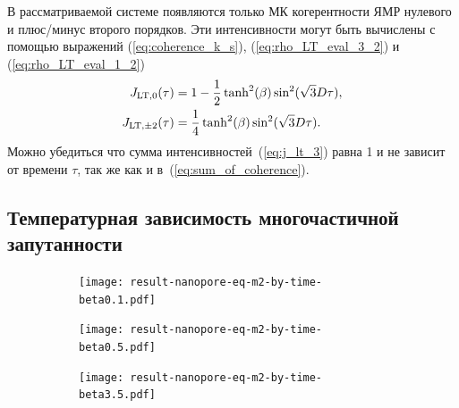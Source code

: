 В рассматриваемой системе появляются только МК когерентности ЯМР нулевого и плюс/минус второго порядков.
Эти интенсивности могут быть вычислены с помощью выражений
(\ref{eq:coherence_k_s}), (\ref{eq:rho_LT_eval_3_2}) и (\ref{eq:rho_LT_eval_1_2})
%
\begin{align}\label{eq:j_lt_3}
  J_{\mathrm{LT}, 0}(\tau) & = 1 - \frac 1 2 \tanh^2(\beta)\sin^2(\sqrt 3 D \tau), \notag \\
  J_{\mathrm{LT},\pm 2}(\tau) & = \frac 1 4 \tanh^2(\beta)\sin^2(\sqrt 3 D \tau).
\end{align}
%
Можно убедиться что сумма интенсивностей~(\ref{eq:j_lt_3}) равна 1
и не зависит от времени $\tau$, так же как и в~(\ref{eq:sum_of_coherence}).


\subsection{Температурная зависимость многочастичной запутанности}
\label{sec:entanglement}

\begin{figure}[h]
  \centering
  \begin{subfigure}[t]{0.31\textwidth}
    \centering
    \texttt{[image: result-nanopore-eq-m2-by-time-beta0.1.pdf]}
    \caption{\protect}
    \label{fig:result-nanopore-eq-m2-by-time-beta0.1}
  \end{subfigure}
  \hfill
  \begin{subfigure}[t]{0.32\textwidth}
    \centering
    \texttt{[image: result-nanopore-eq-m2-by-time-beta0.5.pdf]}
    \caption{\protect}
    \label{fig:result-nanopore-eq-m2-by-time-beta0.5}
  \end{subfigure}
  \hfill
  \begin{subfigure}[t]{0.34\textwidth}
    \centering
    \texttt{[image: result-nanopore-eq-m2-by-time-beta3.5.pdf]}
    \caption{\protect}
    \label{fig:result-nanopore-eq-m2-by-time-beta3.5}
  \end{subfigure}
  \caption{\protect}
  \label{fig:result-nanopore-eq-m2-by-time-betas}
\end{figure}

